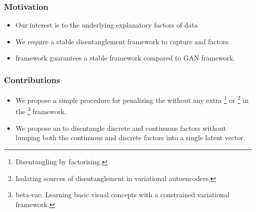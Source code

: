 \documentclass[10pt,mathserif]{beamer}
\begin{document}
\begin{frame}
\frametitle{Motivation}
\begin{itemize}\itemsep=20pt
\item Our interest is to {\color{blue}{disentangle}} the underlying explanatory factors of data {\color{blue}{without any supervision.}}\pause
\item We require a stable disentanglement framework to capture {\color{blue}{continuous}} and {\color{blue}{discrete}} factors.\pause
\item {\color{blue}{VAE}} framework guarantees a stable framework compared to GAN framework.
\end{itemize}
\end{frame}


\begin{frame}
\frametitle{Contributions}
\begin{itemize}\itemsep=20pt
\item We propose a simple procedure for penalizing the {\color{blue}{total correlation}} without any extra {\color{blue}{discriminator network}}\footnote{{\color{blue}{Kim, H. and Mnih, A.}} Disentangling by factorising. {\color{gray}{ICML2018}}} or {\color{blue}{importance sampling}} \footnote{{\color{blue}{Chen, T. Q., Li, X., Grosse, R. B., and Duvenaud, D. K.}} Isolating sources of disentanglement in variational autoencoders. {\color{gray}{NIPS2018}}} in the {\color{blue}{$\beta$-VAE}} \footnote{{\color{blue}{Higgins, I., Matthey, L., Pal, A., Burgess, C., Glorot, X., Botvinick, M., Mohamed, S., and Lerchner, A.}} beta-vae: Learning basic visual concepts with a constrained variational framework. {\color{gray}{ICLR2017}}} framework.\pause
\item We propose an {\color{blue}{alternating disentanglement method}} to disentangle discrete and continuous factors without lumping both the continuous and discrete factors into a single latent vector.
\end{itemize}
\end{frame}
\end{document}

